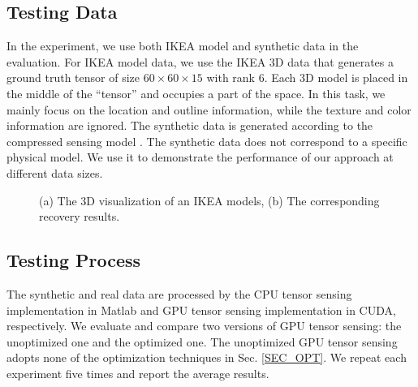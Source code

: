 \documentclass[futureinternet,article,submit,moreauthors,pdftex,10pt,a4paper]{Definitions/mdpi}
\theoremstyle{plain}
\theoremstyle{definition}
\theoremstyle{remark}
\begin{document}
\subsection{Testing Data}
In the experiment, we use both IKEA model and synthetic data in the evaluation. For IKEA model data, we use the IKEA 3D data \cite{matsuda2017multi} that generates a ground truth tensor of size $60 \times 60 \times 15$ with rank 6. Each 3D model is placed in the middle of the “tensor” and occupies a part of the space. In this task, we mainly focus on the location and outline information, while the texture and color information are ignored. The synthetic data is generated according to the compressed sensing model \cite{matsuda2017multi}. The synthetic data does not correspond to a specific physical model. We use it to demonstrate the performance of our approach at different data sizes.
\begin{figure}[t]
\centering
{}
\caption{(a) The 3D visualization of an IKEA models, (b) The corresponding recovery results.}
\label{Fig:chair}
\end{figure}

\subsection{Testing Process}
The synthetic and real data are processed by the CPU tensor sensing implementation in Matlab and GPU tensor sensing implementation in CUDA, respectively. We evaluate and compare two versions of GPU tensor sensing: the unoptimized one and the optimized one. The unoptimized GPU tensor sensing adopts none of the optimization techniques in Sec. \ref{SEC_OPT}.  We repeat each experiment five times and report the average results.
\end{document}
